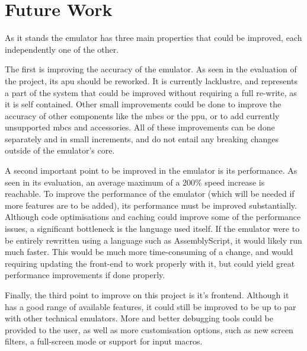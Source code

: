 \documentclass[11pt]{informatics-report}
\begin{document}
\section{Future Work}

As it stands the emulator has three main properties that could be improved, each independently one of the other.

The first is improving the accuracy of the emulator. As seen in the evaluation of the project, its \gls{apu} should be reworked. It is currently lacklustre, and represents a part of the system that could be improved without requiring a full re-write, as it is self contained. Other small improvements could be done to improve the accuracy of other components like the \glspl{mbc} or the \gls{ppu}, or to add currently unsupported \glspl{mbc} and accessories. All of these improvements can be done separately and in small increments, and do not entail any breaking changes outside of the emulator's core.

A second important point to be improved in the emulator is its performance. As seen in its evaluation, an average maximum of a 200\% speed increase is reachable. To improve the performance of the emulator (which will be needed if more features are to be added), its performance must be improved substantially. Although code optimisations and caching could improve some of the performance issues, a significant bottleneck is the language used itself. If the emulator were to be entirely rewritten using a language such as AssemblyScript, it would likely run much faster. This would be much more time-consuming of a change, and would requiring updating the front-end to work properly with it, but could yield great performance improvements if done properly.

Finally, the third point to improve on this project is it's frontend. Although it has a good range of available features, it could still be improved to be up to par with other technical emulators. More and better debugging tools could be provided to the user, as well as more customisation options, such as new screen filters, a full-screen mode or support for input macros.

\clearpage

\printnoidxglossary[type=\acronymtype]

\printbibliography
{}
\end{document}
